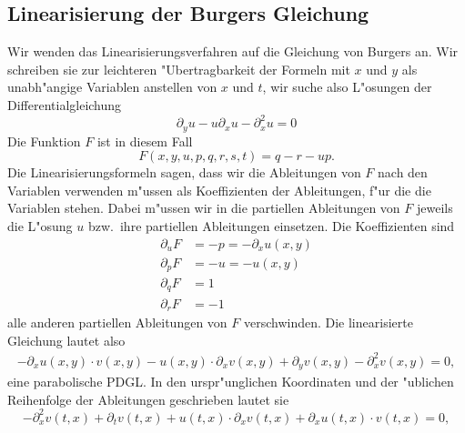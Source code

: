 \subsection{Linearisierung der Burgers Gleichung}
Wir wenden das Linearisierungsverfahren auf die Gleichung von Burgers an.
Wir schreiben sie zur leichteren "Ubertragbarkeit der Formeln
mit $x$ und $y$ als unabh"angige Variablen anstellen von $x$ und $t$,
wir suche also L"osungen der Differentialgleichung
$$\partial_yu-u\partial_xu-\partial_x^2u=0$$
Die Funktion $F$ ist in diesem Fall
$$F(x,y,u,p,q,r,s,t)=q-r-up.$$
Die Linearisierungsformeln sagen, dass wir die Ableitungen von $F$ nach
den Variablen verwenden m"ussen als Koeffizienten der Ableitungen,
f"ur die die Variablen stehen.  Dabei m"ussen wir in die partiellen Ableitungen
von $F$ jeweils die L"osung $u$ bzw.~ihre partiellen Ableitungen einsetzen.
Die Koeffizienten sind
\begin{align*}
\partial_uF&=-p=-\partial_xu(x,y)
\\
\partial_pF
&=-u=-u(x,y)
\\
\partial_qF
&=1
\\
\partial_rF
&=-1
\end{align*}
alle anderen partiellen Ableitungen von $F$ verschwinden. Die linearisierte
Gleichung lautet also
\begin{align*}
-\partial_xu(x,y)\cdot v(x,y)
-
u(x,y)\cdot\partial_xv(x,y)
+\partial_yv(x,y)
-\partial_x^2v(x,y)=0,
\end{align*}
eine parabolische PDGL. In den urspr"unglichen Koordinaten und der
"ublichen Reihenfolge der Ableitungen geschrieben
lautet sie
$$
-\partial_x^2v(t,x)
+\partial_tv(t,x)
+ u(t,x)\cdot\partial_xv(t,x)
+\partial_xu(t,x)\cdot v(t,x)
=0,
$$

